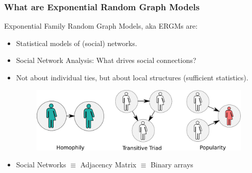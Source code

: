 \documentclass[aspectratio=169, 9pt]{beamer}
\begin{document}
\begin{frame}[label=ermgs-description]
	\frametitle{What are Exponential Random Graph Models}
	
	Exponential Family Random Graph Models, aka \alert{ERGMs} are:\pause
	
	\begin{itemize}
		\item Statistical models of (social) networks.\pause
		\item Social Network Analysis: What drives social connections?
		\item Not about individual ties, but about local structures (sufficient statistics).\pause
		\begin{figure}
			\includegraphics[width=.6\linewidth]{friendly-terms.pdf}
		\end{figure}
		\item Social Networks $\equiv$ Adjacency Matrix $\equiv$ Binary arrays
	\end{itemize}
	
\end{frame}
\end{document}
